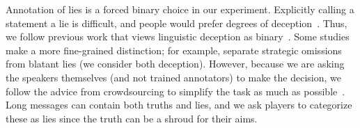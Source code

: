 

Annotation of lies is a forced binary choice in our experiment.
%
Explicitly calling a statement a lie is difficult, and people would
prefer degrees of deception~\citep{bavelas1990truths, bell1996liking}.
%
Thus, we follow previous work that views linguistic deception as
binary~\citep{buller-96,braun-16}.
%
Some studies make a more fine-grained distinction; for example,
\citet{vanswol-12} separate strategic omissions from blatant lies (we
consider both deception).
%
However, because we are asking the speakers themselves (and not
trained annotators) to make the decision, we follow the advice from
crowdsourcing to simplify the task as much as
possible~\citep{snow2008cheap, sabou2014corpus}.
%
%
%
Long messages can contain both truths and lies, and we ask players to
categorize these as lies since the truth can be a shroud for their
aims.




